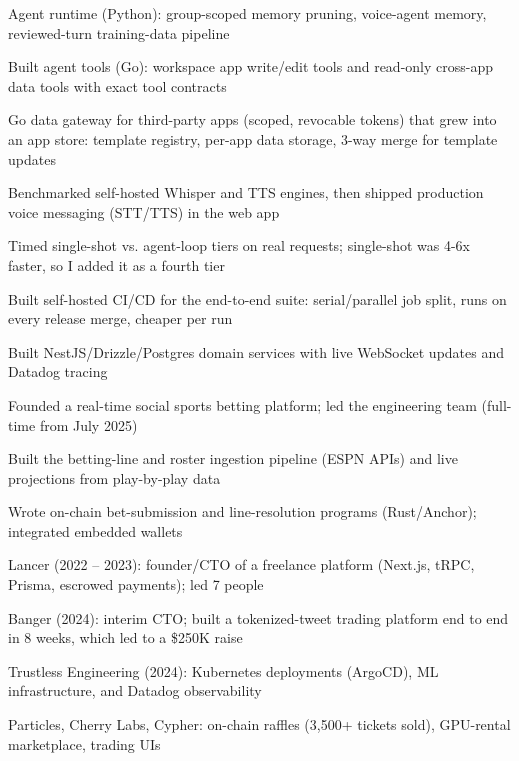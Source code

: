 \documentclass[print]{jack-resume}
\begin{document}
\begin{tightemize}
    \item Agent runtime (Python): group-scoped memory pruning, voice-agent memory, reviewed-turn training-data pipeline
    \item Built agent tools (Go): workspace app write/edit tools and read-only cross-app data tools with exact tool contracts
    \item Go data gateway for third-party apps (scoped, revocable tokens) that grew into an app store: template registry, per-app data storage, 3-way merge for template updates
    \item Benchmarked self-hosted Whisper and TTS engines, then shipped production voice messaging (STT/TTS) in the web app
    \item Timed single-shot vs. agent-loop tiers on real requests; single-shot was 4-6x faster, so I added it as a fourth tier
    \item Built self-hosted CI/CD for the end-to-end suite: serial/parallel job split, runs on every release merge, cheaper per run
\end{tightemize}
\sectionsep

\begin{tightemize}
    \item Built NestJS/Drizzle/Postgres domain services with live WebSocket updates and Datadog tracing
    \item Founded a real-time social sports betting platform; led the engineering team (full-time from July 2025)
    \item Built the betting-line and roster ingestion pipeline (ESPN APIs) and live projections from play-by-play data
    \item Wrote on-chain bet-submission and line-resolution programs (Rust/Anchor); integrated embedded wallets
\end{tightemize}
\sectionsep

\begin{tightemize}
    \item Lancer (2022 – 2023): founder/CTO of a freelance platform (Next.js, tRPC, Prisma, escrowed payments); led 7 people
    \item Banger (2024): interim CTO; built a tokenized-tweet trading platform end to end in 8 weeks, which led to a \$250K raise
    \item Trustless Engineering (2024): Kubernetes deployments (ArgoCD), ML infrastructure, and Datadog observability
    \item Particles, Cherry Labs, Cypher: on-chain raffles (3,500+ tickets sold), GPU-rental marketplace, trading UIs
\end{tightemize}
\sectionsep
\end{document}
